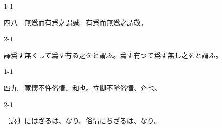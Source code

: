 \documentclass[tate,paper=b6j,jafontsize=9pt]{jlreq}
\begin{document}
\begin{azconvIndented}{1\zw}{-1\zw}

四八　無爲而有爲之謂誠。有爲而無爲之謂敬。

\end{azconvIndented}
\begin{azconvIndented}{2\zw}{-1\zw}

譯爲す無くして爲す有る之をと謂ふ。爲す有つて爲す無し之をと謂ふ。

\end{azconvIndented}

\begin{azconvIndented}{1\zw}{-1\zw}

四九　寛懷不忤俗情、和也。立脚不墜俗情、介也。

\end{azconvIndented}
\begin{azconvIndented}{2\zw}{-1\zw}

〔譯〕にはざるは、なり。俗情にちざるは、なり。

\end{azconvIndented}
\end{document}
